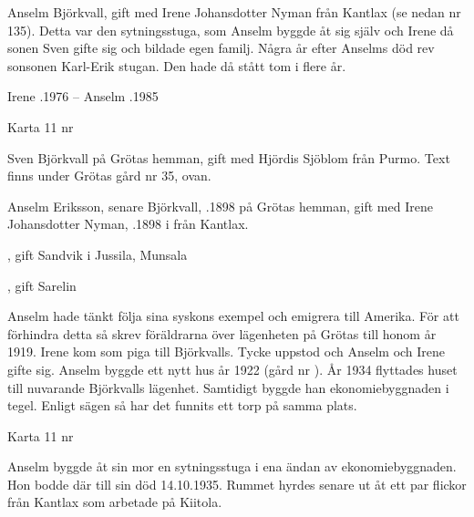 Anselm  Björkvall,  gift med Irene Johansdotter Nyman från Kantlax (se nedan nr 135).
Detta var den sytningsstuga, som Anselm byggde åt sig själv och Irene då sonen Sven gifte sig och bildade egen familj. Några år efter Anselms död rev sonsonen Karl-Erik stugan. Den hade då stått tom i flere år.

Irene .1976  --  Anselm .1985



 Karta 11  nr 


Sven Björkvall på Grötas hemman, gift med Hjördis Sjöblom från Purmo. Text finns under Grötas gård nr 35, ovan.


Anselm Eriksson, senare Björkvall, .1898 på Grötas hemman, gift med Irene Johansdotter Nyman, .1898 i från Kantlax.
\begin{jhchildren}
  \item {}
  \item {}, gift Sandvik i Jussila, Munsala
  \item {}, gift Sarelin
  \item {}
\end{jhchildren}
Anselm hade tänkt följa sina syskons exempel och emigrera till Amerika. För att förhindra detta så skrev föräldrarna över lägenheten på Grötas till honom år 1919. Irene kom som piga till Björkvalls. Tycke uppstod och Anselm och Irene gifte sig. Anselm byggde ett nytt hus år 1922 (gård nr ). År 1934 flyttades huset till nuvarande Björkvalls lägenhet. Samtidigt byggde han ekonomiebyggnaden i tegel. Enligt sägen så har det funnits ett torp på samma plats.



  Karta 11	 nr 

Anselm byggde åt sin mor en sytningsstuga i ena ändan av ekonomiebyggnaden. Hon bodde där till sin död 14.10.1935.
Rummet hyrdes senare ut  åt ett par flickor från Kantlax som 	arbetade på Kiitola.

